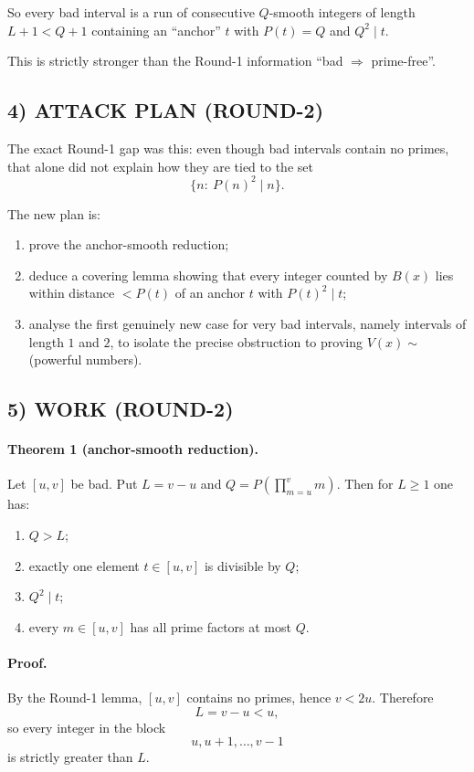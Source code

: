 So every bad interval is a run of consecutive $Q$-smooth integers of length $L+1<Q+1$ containing an ``anchor'' $t$ with $P(t)=Q$ and $Q^2\mid t$.

This is strictly stronger than the Round-1 information ``bad $\Rightarrow$ prime-free''.

\subsection*{4) ATTACK PLAN (ROUND-2)}

The exact Round-1 gap was this: even though bad intervals contain no primes, that alone did not explain how they are tied to the set
\[
\{n:\ P(n)^2\mid n\}.
\]

The new plan is:

\begin{enumerate}
\item prove the anchor-smooth reduction;
\item deduce a covering lemma showing that every integer counted by $B(x)$ lies within distance $<P(t)$ of an anchor $t$ with $P(t)^2\mid t$;
\item analyse the first genuinely new case for very bad intervals, namely intervals of length $1$ and $2$, to isolate the precise obstruction to proving $V(x)\sim$ (powerful numbers).
\end{enumerate}

\subsection*{5) WORK (ROUND-2)}

\paragraph{Theorem 1 (anchor-smooth reduction).}
Let $[u,v]$ be bad. Put $L=v-u$ and $Q=P\!\left(\prod_{m=u}^{v}m\right)$.
Then for $L\ge 1$ one has:
\begin{enumerate}
\item $Q>L$;
\item exactly one element $t\in [u,v]$ is divisible by $Q$;
\item $Q^2\mid t$;
\item every $m\in [u,v]$ has all prime factors at most $Q$.
\end{enumerate}

\paragraph{Proof.}
By the Round-1 lemma, $[u,v]$ contains no primes, hence $v<2u$. Therefore
\[
L=v-u<u,
\]
so every integer in the block
\[
u,u+1,\dots,v-1
\]
is strictly greater than $L$.

